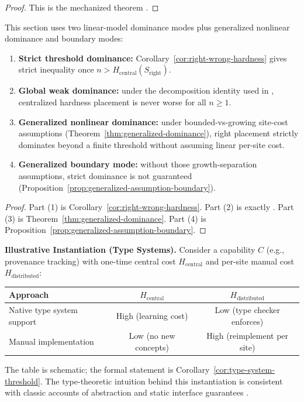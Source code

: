 \begin{proof}
This is the mechanized theorem .
\end{proof}

\begin{proposition}\label{prop:dominance-modes}
This section uses two linear-model dominance modes plus generalized nonlinear dominance and boundary modes:
\begin{enumerate}
\item \textbf{Strict threshold dominance:} Corollary~\ref{cor:right-wrong-hardness} gives strict inequality once $n > H_{\mathrm{central}}(S_{\mathrm{right}})$.
\item \textbf{Global weak dominance:} under the decomposition identity used in , centralized hardness placement is never worse for all $n\ge 1$.
\item \textbf{Generalized nonlinear dominance:} under bounded-vs-growing site-cost assumptions (Theorem~\ref{thm:generalized-dominance}), right placement strictly dominates beyond a finite threshold without assuming linear per-site cost.
\item \textbf{Generalized boundary mode:} without those growth-separation assumptions, strict dominance is not guaranteed (Proposition~\ref{prop:generalized-assumption-boundary}).
\end{enumerate}
\end{proposition}

\begin{proof}
Part (1) is Corollary~\ref{cor:right-wrong-hardness}. Part (2) is exactly . Part (3) is Theorem~\ref{thm:generalized-dominance}. Part (4) is Proposition~\ref{prop:generalized-assumption-boundary}.
\end{proof}

\textbf{Illustrative Instantiation (Type Systems).} Consider a capability $C$ (e.g., provenance tracking) with one-time central cost $H_{\text{central}}$ and per-site manual cost $H_{\text{distributed}}$:

\begin{center}
\begin{tabular}{lcc}
\toprule
\textbf{Approach} & $H_{\text{central}}$ & $H_{\text{distributed}}$ \\
\midrule
Native type system support & High (learning cost) & Low (type checker enforces) \\
Manual implementation & Low (no new concepts) & High (reimplement per site) \\
\bottomrule
\end{tabular}
\end{center}
The table is schematic; the formal statement is Corollary~\ref{cor:type-system-threshold}. The type-theoretic intuition behind this instantiation is consistent with classic accounts of abstraction and static interface guarantees \cite{Cardelli1985, reynolds1983types, pierce2002types, liskov1994behavioral, siek2006gradual, gamma1994design}.

